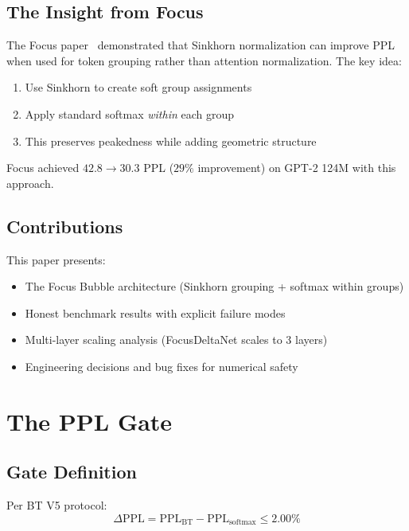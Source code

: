 \documentclass[11pt]{article}
\begin{document}
\subsection{The Insight from Focus}

The Focus paper~\cite{focus2026} demonstrated that Sinkhorn normalization can improve PPL when used for token grouping rather than attention normalization. The key idea:

\begin{enumerate}
  \item Use Sinkhorn to create soft group assignments
  \item Apply standard softmax \emph{within} each group
  \item This preserves peakedness while adding geometric structure
\end{enumerate}

Focus achieved $42.8 \to 30.3$ PPL ($29\%$ improvement) on GPT-2 124M with this approach.

\subsection{Contributions}

This paper presents:

\begin{itemize}
  \item The Focus Bubble architecture (Sinkhorn grouping + softmax within groups)
  \item Honest benchmark results with explicit failure modes
  \item Multi-layer scaling analysis (FocusDeltaNet scales to 3 layers)
  \item Engineering decisions and bug fixes for numerical safety
\end{itemize}

\section{The PPL Gate}

\subsection{Gate Definition}

Per BT V5 protocol:
\begin{equation}
  \Delta\text{PPL} = \text{PPL}_{\text{BT}} - \text{PPL}_{\text{softmax}} \leq 2.00\%
\end{equation}
\end{document}
